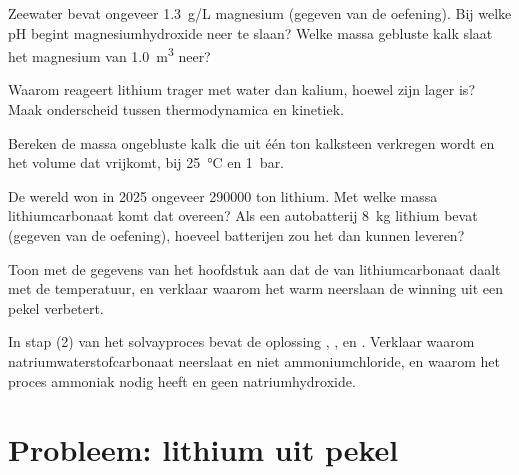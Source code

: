 \begin{exercise}[$\star\star$]\label{exo:b1:s-block:7}
Zeewater bevat ongeveer \qty{1.3}{g/L} magnesium (gegeven van de
oefening). Bij welke pH begint magnesiumhydroxide neer te slaan? Welke
massa gebluste kalk slaat het magnesium van \qty{1.0}{m^3} neer?
\end{exercise}

\begin{exercise}[$\star\star$]\label{exo:b1:s-block:8}
Waarom reageert lithium trager met water dan kalium, hoewel zijn
 lager is? Maak onderscheid tussen thermodynamica en
kinetiek.
\end{exercise}

\begin{exercise}[$\star\star$]\label{exo:b1:s-block:9}
Bereken de massa ongebluste kalk die uit één ton kalksteen verkregen
wordt en het volume  dat vrijkomt, bij \qty{25}{\celsius} en
\qty{1}{bar}.
\end{exercise}

\begin{exercise}[$\star\star\star$]\label{exo:b1:s-block:10}
De wereld won in 2025 ongeveer \num{290000} ton lithium. Met welke massa
lithiumcarbonaat komt dat overeen? Als een autobatterij \qty{8}{kg}
lithium bevat (gegeven van de oefening), hoeveel batterijen zou het dan
kunnen leveren?
\end{exercise}

\begin{exercise}[$\star\star\star$]\label{exo:b1:s-block:11}
Toon met de gegevens van het hoofdstuk aan dat de  van
lithiumcarbonaat daalt met de temperatuur, en verklaar waarom het warm
neerslaan de winning uit een pekel verbetert.
\end{exercise}

\begin{exercise}[$\star\star\star$]\label{exo:b1:s-block:12}
In stap (2) van het solvayproces bevat de oplossing ,
,  en . Verklaar waarom
natriumwaterstofcarbonaat neerslaat en niet ammoniumchloride, en waarom
het proces ammoniak nodig heeft en geen natriumhydroxide.
\end{exercise}

\section{Probleem: lithium uit pekel}

